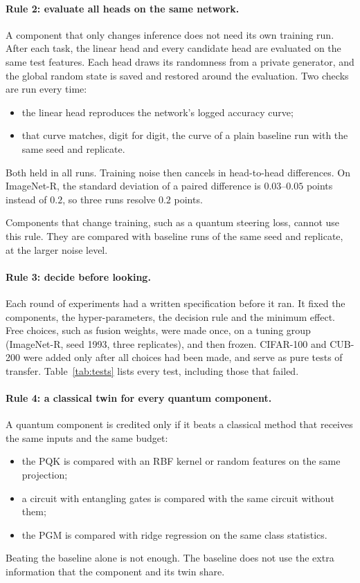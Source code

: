 \paragraph{Rule 2: evaluate all heads on the same network.}
A component that only changes inference does not need its own training run.
After each task, the linear head and every candidate head are evaluated on
the same test features. Each head draws its randomness from a private
generator, and the global random state is saved and restored around the
evaluation. Two checks are run every time:
\begin{itemize}
  \item the linear head reproduces the network's logged accuracy curve;
  \item that curve matches, digit for digit, the curve of a plain baseline
    run with the same seed and replicate.
\end{itemize}
Both held in all runs. Training noise then cancels in head-to-head
differences. On ImageNet-R, the standard deviation of a paired difference is
$0.03$--$0.05$ points instead of $0.2$, so three runs resolve $0.2$ points.

Components that change training, such as a quantum steering loss, cannot
use this rule. They are compared with baseline runs of the same seed and
replicate, at the larger noise level.

\paragraph{Rule 3: decide before looking.}
Each round of experiments had a written specification before it ran. It
fixed the components, the hyper-parameters, the decision rule and the
minimum effect. Free choices, such as fusion weights, were made once, on a
tuning group (ImageNet-R, seed 1993, three replicates), and then frozen.
CIFAR-100 and CUB-200 were added only after all choices had been made, and
serve as pure tests of transfer. Table~\ref{tab:tests} lists every test,
including those that failed.

\paragraph{Rule 4: a classical twin for every quantum component.}
A quantum component is credited only if it beats a classical method that
receives the same inputs and the same budget:
\begin{itemize}
  \item the PQK is compared with an RBF kernel or random features on the
    same projection;
  \item a circuit with entangling gates is compared with the same circuit
    without them;
  \item the PGM is compared with ridge regression on the same class
    statistics.
\end{itemize}
Beating the baseline alone is not enough. The baseline does not use the
extra information that the component and its twin share.
